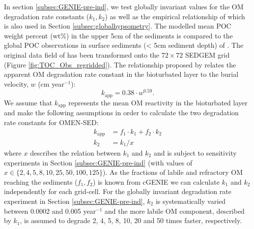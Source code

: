 \documentclass[gmd, manuscript]{copernicus}
\begin{document}
In section \ref{subsec:GENIE-pre-ind}, we test globally invariant values for the OM degradation rate constants ($k_1, k_2$) as well as the empirical relationship of \citet{boudreau1997diagenetic} which is also used in 
Section \ref{subsec:globalhypsometry}. The modelled mean POC weight percent (wt\%) in the upper 5cm of the sediments is compared to the global POC observations in surface sediments (< 5cm sediment depth) of \citet{seiter_organic_2004}. 
The original data field of \citet{seiter_organic_2004} has been transformed onto the $72\times 72$ SEDGEM grid (Figure \ref{fig:TOC_Obs_regridded}). %
The relationship proposed by \citet{boudreau1997diagenetic} relates the apparent OM degradation rate constant in the bioturbated layer to the burial velocity, $w$ (cm year$^{-1}$):
\begin{equation}
 k_\mathrm{app} = 0.38 \cdot w^{0.59}.
\end{equation}
We assume that $k_\mathrm{app}$ represents the mean OM reactivity in the bioturbated layer and make the following assumptions in order to calculate the two degradation rate constants for OMEN-SED:
\begin{align}
  k_\mathrm{app} &= f_1 \cdot k_1 + f_2 \cdot k_2 \\
  k_2 &= k_1/x
\end{align}
where $x$ describes the relation between $k_1$ and $k_2$ and is subject to sensitivity experiments in Section \ref{subsec:GENIE-pre-ind} (with values of $x \in \{2, 4, 5, 8, 10, 25, 50, 100, 125\}$). 
As the fractions of labile and refractory OM reaching the sediments ($f_1, f_2$) is known from cGENIE we can calculate $k_1$ and $k_2$ independently for each grid-cell. 
For the globally invariant degradation rate experiment in Section \ref{subsec:GENIE-pre-ind}, $k_2$ is systematically varied between 0.0002 and 0.005 year$^{-1}$ and the more labile OM component, described by $k_1$, is 
assumed to degrade 2, 4, 5, 8, 10, 20 and 50 times faster, respectively. 
\end{document}

